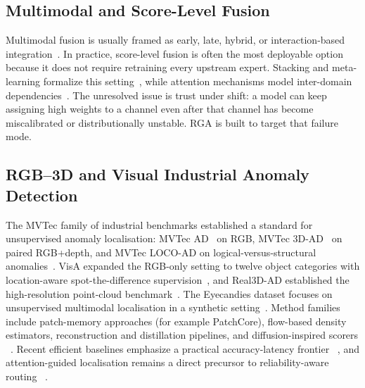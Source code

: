 \documentclass[10pt,conference]{IEEEtran}
\newcommand{\method}{RGA}
\begin{document}
\subsection{Multimodal and Score-Level Fusion}
Multimodal fusion is usually framed as early, late, hybrid, or interaction-based
integration~\cite{baltrusaitis2019multimodal,lahat2015multimodal,atrey2010multimodal,hall1997introduction,dasarathy1997sensor,poria2017review,ngiam2011multimodal}.
In practice, score-level fusion is often the most deployable option because it
does not require retraining every upstream expert. Stacking and meta-learning
formalize this setting~\cite{wolpert1992stacked}, while attention mechanisms
model inter-domain dependencies~\cite{vaswani2017attention,dosovitskiy2020vit,liu2021swin,jaegle2021perceiver,ramachandran2019stand,radford2021learning,lu2019vilbert,girdhar2022omnivore}.
The unresolved issue is trust under shift: a model can keep assigning high
weights to a channel even after that channel has become miscalibrated or
distributionally unstable. \method{} is built to target that failure mode.

\subsection{RGB--3D and Visual Industrial Anomaly Detection}
The MVTec family of industrial benchmarks established a standard for
unsupervised anomaly localisation: MVTec AD~\cite{bergmann2019mvtec} on RGB,
MVTec 3D-AD~\cite{bergmann2022mvtec3d} on paired RGB+depth, and MVTec LOCO-AD
on logical-versus-structural anomalies~\cite{bergmann2023logical}. VisA
expanded the RGB-only setting to twelve object categories with
location-aware spot-the-difference supervision~\cite{zou2022visa}, and
Real3D-AD established the high-resolution point-cloud
benchmark~\cite{liu2023real3dad}. The Eyecandies dataset focuses on
unsupervised multimodal localisation in a synthetic
setting~\cite{bonfiglioli2022eyecandies}. Method families include patch-memory
approaches (for example PatchCore), flow-based density estimators, reconstruction
and distillation pipelines, and diffusion-inspired scorers
~\cite{roth2022patchcore,yu2021fastflow,gudovskiy2022cflow,rudolph2021same,defard2021padim,cohen2020spade,zavrtanik2021draem,li2021cutpaste,yi2020patchsvdd,pirnay2022inpainting,hou2021divide,bergmann2020uninformed,wang2021stpm,deng2022rd4ad,salehi2021multiresolution,yamada2022reconstruction,wyatt2022anoddpm,zhang2023diffusionad,mousakhan2024anomaly}.
Recent efficient baselines emphasize a practical accuracy-latency frontier
~\cite{liu2023simplenet,batzner2024efficientad}, and attention-guided
localisation remains a direct precursor to reliability-aware routing
~\cite{venkataramanan2020attention}.
\end{document}

